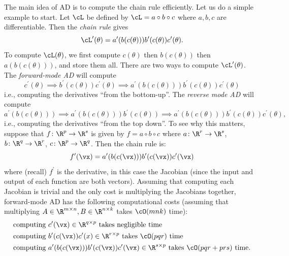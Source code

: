 \documentclass[../../book-main.tex]{subfiles}
\begin{document}
The main idea of AD is to compute the chain rule efficiently. Let us do a simple example to start. Let \(\cL\) be defined by \(\cL = a \circ b \circ c\) where \(a, b, c\) are differentiable. Then the \textit{chain rule} gives
\begin{equation}
    \cL^{\prime}(\theta) = a^{\prime}(b(c(\theta)))b^{\prime}(c(\theta))c^{\prime}(\theta).
\end{equation}
To compute \(\cL(\theta)\), we first compute \(c(\theta)\) then \(b(c(\theta))\) then \(a(b(c(\theta)))\), and store them all. There are two ways to compute \(\cL^{\prime}(\theta)\). The \textit{forward-mode AD} will compute 
\begin{equation}
    c^{\prime}(\theta) \implies b^{\prime}(c(\theta))c^{\prime}(\theta) \implies a^{\prime}(b(c(\theta)))b^{\prime}(c(\theta))c^{\prime}(\theta)
\end{equation}
i.e., computing the derivatives ``from the bottom-up''. The \textit{reverse mode AD} will compute 
\begin{equation}
    a^{\prime}(b(c(\theta))) \implies a^{\prime}(b(c(\theta)))b^{\prime}(c(\theta)) \implies a^{\prime}(b(c(\theta)))b^{\prime}(c(\theta))c^{\prime}(\theta),
\end{equation}
i.e., computing the derivatives ``from the top down''. To see why this matters, suppose that \(f \colon \R^{p} \to \R^{s}\) is given by \(f = a \circ b \circ c\) where \(a \colon \R^{r} \to \R^{s}\), \(b \colon \R^{q} \to \R^{r}\), \(c \colon \R^{p} \to \R^{q}\). Then the chain rule is:
\begin{equation}
    f^{\prime}(\vx) = a^{\prime}(b(c(\vx)))b^{\prime}(c(\vx))c^{\prime}(\vx)
\end{equation}
where (recall) \(f^{\prime}\) is the derivative, in this case the Jacobian (since the input and output of each function are both vectors). Assuming that computing each Jacobian is trivial and the only cost is multiplying the Jacobians together, forward-mode AD has the following computational costs (assuming that multiplying \(A \in \R^{m \times n}, B \in \R^{n \times k}\) takes \(\cO(mnk)\) time):
\begin{align}
    &\text{computing}\ c^{\prime}(\vx) \in \R^{q \times p}\ \text{takes negligible time} \\
    &\text{computing}\ b^{\prime}(c(\vx))c^{\prime}(x) \in \R^{r \times p}\ \text{takes \(\cO(pqr)\) time} \\
    &\text{computing}\ a^{\prime}(b(c(\vx)))b^{\prime}(c(\vx))c^{\prime}(\vx) \in \R^{s \times p}\ \text{takes \(\cO(pqr + prs)\) time.}
\end{align}
\end{document}
